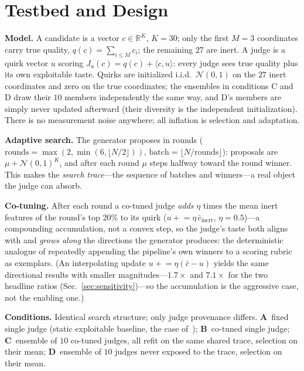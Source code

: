 \documentclass[sigconf]{acmart}
\begin{document}
\section{Testbed and Design}
\textbf{Model.} A candidate is a vector $c\in\mathbb{R}^{K}$, $K{=}30$; only the first $M{=}3$ coordinates carry true quality, $q(c)=\sum_{i\le M}c_i$; the remaining $27$ are inert. A judge is a quirk vector $u$ scoring $J_u(c)=q(c)+\langle c,u\rangle$: every judge sees true quality plus its own exploitable taste. Quirks are initialized i.i.d.\ $\mathcal{N}(0,1)$ on the $27$ inert coordinates and zero on the true coordinates; the ensembles in conditions C and D draw their $10$ members independently the same way, and D's members are simply never updated afterward (their diversity is the independent initialization). There is no measurement noise anywhere; all inflation is selection and adaptation.

\textbf{Adaptive search.} The generator proposes in rounds ($\text{rounds}=\max(2,\min(6,\lfloor N/2\rfloor))$, $\text{batch}=\lfloor N/\text{rounds}\rfloor$): proposals are $\mu+\mathcal{N}(0,1)^{K}$, and after each round $\mu$ steps halfway toward the round winner. This makes the \emph{search trace}---the sequence of batches and winners---a real object the judge can absorb.

\textbf{Co-tuning.} After each round a co-tuned judge \emph{adds} $\eta$ times the mean inert features of the round's top 20\% to its quirk ($u \mathrel{+}= \eta\,\bar c_{\text{inert}}$, $\eta{=}0.5$)---a compounding accumulation, not a convex step, so the judge's taste both aligns with and \emph{grows along} the directions the generator produces: the deterministic analogue of repeatedly appending the pipeline's own winners to a scoring rubric as exemplars. (An interpolating update $u \mathrel{+}= \eta(\bar c - u)$ yields the same directional results with smaller magnitudes---$1.7\times$ and $7.1\times$ for the two headline ratios (Sec.~\ref{sec:sensitivity})---so the accumulation is the aggressive case, not the enabling one.)

\textbf{Conditions.} Identical search structure; only judge provenance differs. \textbf{A}~fixed single judge (static exploitable baseline, the case of~\cite{gao2023}); \textbf{B}~co-tuned single judge; \textbf{C}~ensemble of $10$ co-tuned judges, all refit on the same shared trace, selection on their mean; \textbf{D}~ensemble of $10$ judges never exposed to the trace, selection on their mean.
\end{document}
